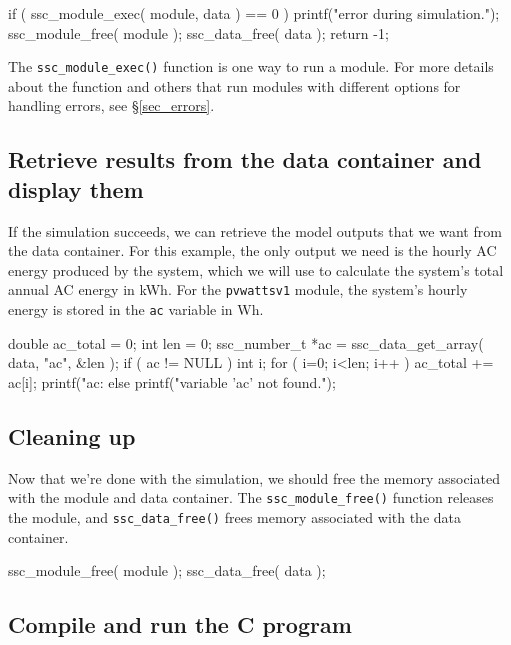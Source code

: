 \documentclass{scrartcl} %
\newcommand{\+}{\discretionary{\mbox{\scriptsize$\hookleftarrow$}}{}{}}
\begin{document}
\begin{verbatimtab}[4]
	if ( ssc_module_exec( module, data ) == 0 )
	{
		printf("error during simulation.\n");
		ssc_module_free( module );
		ssc_data_free( data );
		return -1;
	}
\end{verbatimtab}

The \texttt{ssc\_module\_exec()} function is one way to run a module. For more details about the function and others that run modules with different options for handling errors, see \S\ref{sec_errors}.

\subsection{Retrieve results from the data container and display them}

If the simulation succeeds, we can retrieve the model outputs that we want from the data container. For this example, the only output we need is the hourly AC energy produced by the system, which we will use to calculate the system's total annual AC energy in kWh. For the \texttt{pvwattsv1} module, the system's hourly energy is stored in the \texttt{ac} variable in Wh.

\begin{verbatimtab}[4]
	double ac_total = 0;
	int len = 0;
	ssc_number_t *ac = ssc_data_get_array( data, "ac", &len );
	if ( ac != NULL )
	{
		int i;
		for ( i=0; i<len; i++ )
			ac_total += ac[i];
		printf("ac: %
	}
	else
	{
		printf("variable 'ac' not found.\n");
	}
\end{verbatimtab}

\subsection{Cleaning up}

Now that we're done with the simulation, we should free the memory associated with the module and data container. The \texttt{ssc\_module\_free()} function releases the module, and \texttt{ssc\_data\_free()} frees memory associated with the data container. 

\begin{verbatimtab}	
	ssc_module_free( module );
	ssc_data_free( data );
\end{verbatimtab}

\subsection{Compile and run the C program}
\end{document}
